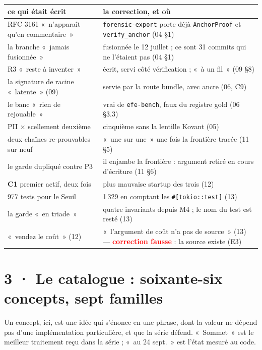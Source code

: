 \documentclass[10pt]{article}
\newcommand{\code}[1]{\texttt{\small #1}}
\newcommand{\ko}[1]{\textcolor{red}{\textbf{#1}}}
\newcommand{\cun}{\textcolor{c1col}{\textbf{C1}}}
\begin{document}
{\small
\renewcommand{\arraystretch}{1.12}
\begin{longtable}{@{}L{8.4cm}L{8.8cm}@{}}
\toprule
\textbf{ce qui était écrit} & \textbf{la correction, et où} \\ \midrule \endhead
RFC 3161 «~n'apparaît qu'en commentaire~» & \code{forensic-export} porte déjà \code{AnchorProof} et \code{verify\_anchor} (04 §1) \\
la branche «~jamais fusionnée~» & fusionnée le 12 juillet ; ce sont 31 commits qui ne l'étaient pas (04 §1) \\
R3 «~reste à inventer~» & écrit, servi côté vérification ; «~à un fil~» (09 §8) \\
la signature de racine «~latente~» (09) & servie par la route bundle, avec ancre (06, C9) \\
le banc «~rien de rejouable~» & vrai de \code{efe-bench}, faux du registre gold (06 §3.3) \\
PII × scellement deuxième & cinquième sans la lentille Kovant (05) \\
deux chaînes re-prouvables sur neuf & «~une sur une~» une fois la frontière tracée (11 §5) \\
le garde dupliqué contre P3 & il enjambe la frontière : argument retiré en cours d'écriture (11 §6) \\
\cun{} premier actif, deux fois & plus mauvaise startup des trois (12) \\
977 tests pour le Seuil & 1\,329 en comptant les \code{\#[tokio::test]} (13) \\
la garde «~en triade~» & quatre invariants depuis M4 ; le nom du test est resté (13) \\
«~vendez le coût~» (12) & «~l'argument de coût n'a pas de source~» (13) --- \ko{correction fausse} : la source existe (E3) \\
\bottomrule
\end{longtable}
}

\section{3 · Le catalogue : soixante-six concepts, sept familles}

Un concept, ici, est une idée qui s'énonce en une phrase, dont la valeur ne dépend pas d'une implémentation
particulière, et que la série défend. «~Sommet~» est le meilleur traitement reçu dans la série ; «~au 24 sept.~»
est l'état mesuré au code.
\end{document}
